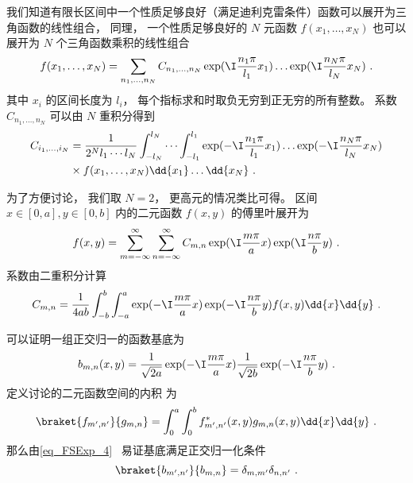 

我们知道有限长区间中一个性质足够良好（满足迪利克雷条件）函数可以展开为三角函数的线性组合， 同理， 一个性质足够良好的 $N$ 元函数 $f(x_1, \dots, x_N)$ 也可以展开为 $N$ 个三角函数乘积的线性组合
\begin{equation}
f(x_1, \dots, x_N) = \sum_{n_1,\dots, n_N} C_{n_1,\dots, n_N} \exp(\I \frac{n_1\pi}{l_1} x_1) \dots \exp(\I \frac{n_N \pi}{l_N} x_N)~.
\end{equation}
其中 $x_i$ 的区间长度为 $l_i$， 每个指标求和时取负无穷到正无穷的所有整数。 系数 $C_{n_1,\dots, n_N}$ 可以由 $N$ 重积分得到
\begin{equation}
\begin{aligned}
C_{i_1,\dots, i_N} &= \frac{1}{2^Nl_1\cdots l_N}\int_{-l_N}^{l_N}\cdots\int_{-l_1}^{l_1} \exp(-\I \frac{n_1 \pi}{l_1} x_1) \dots \exp(-\I \frac{n_N \pi}{l_N} x_N)\\
 & \times f(x_1, \dots, x_N) \dd{x_1}\dots\dd{x_N}~.
\end{aligned}
\end{equation}

为了方便讨论， 我们取 $N = 2$， 更高元的情况类比可得。 区间 $x\in [0, a], y\in [0, b]$ 内的二元函数 $f(x, y)$ 的傅里叶展开为
\begin{equation}
f(x, y) = \sum_{m = -\infty}^\infty \sum_{n = -\infty}^\infty C_{m, n} \exp(\I \frac{m \pi}{a} x) \exp(\I \frac{n \pi}{b} y)~.
\end{equation}
系数由二重积分计算
\begin{equation}
C_{m, n} = \frac{1}{4ab}\int_{-b}^b\int_{-a}^a \exp(-\I \frac{m \pi}{a} x) \exp(-\I \frac{n \pi}{b} y) f(x, y) \dd{x} \dd{y}~.
\end{equation}

可以证明一组正交归一的函数基底为
\begin{equation}
b_{m,n}(x, y) = \frac{1}{\sqrt{2a}}\exp(-\I \frac{m \pi}{a} x) \frac{1}{\sqrt{2b}}\exp(-\I \frac{n \pi}{b} y)~.
\end{equation}
定义讨论的二元函数空间的内积 为
\begin{equation}
\braket{f_{m',n'}}{g_{m,n}} = \int_0^a\int_0^b f^*_{m',n'}(x, y) g_{m,n}(x, y) \dd{x}\dd{y}~.
\end{equation}
那么由\autoref{eq_FSExp_4}~ 易证基底满足正交归一化条件
\begin{equation}
\braket{b_{m',n'}}{b_{m,n}} = \delta_{m,m'} \delta_{n,n'}~.
\end{equation}

